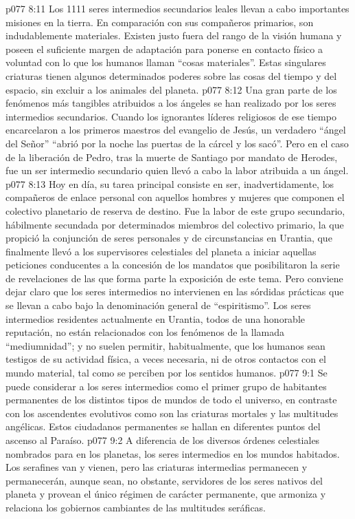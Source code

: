 \vs p077 8:11 Los 1111 seres intermedios secundarios leales llevan a cabo importantes misiones en la tierra. En comparación con sus compañeros primarios, son indudablemente materiales. Existen justo fuera del rango de la visión humana y poseen el suficiente margen de adaptación para ponerse en contacto físico a voluntad con lo que los humanos llaman “cosas materiales”. Estas singulares criaturas tienen algunos determinados poderes sobre las cosas del tiempo y del espacio, sin excluir a los animales del planeta.
\vs p077 8:12 Una gran parte de los fenómenos más tangibles atribuidos a los ángeles se han realizado por los seres intermedios secundarios. Cuando los ignorantes líderes religiosos de ese tiempo encarcelaron a los primeros maestros del evangelio de Jesús, un verdadero “ángel del Señor” “abrió por la noche las puertas de la cárcel y los sacó”. Pero en el caso de la liberación de Pedro, tras la muerte de Santiago por mandato de Herodes, fue un ser intermedio secundario quien llevó a cabo la labor atribuida a un ángel.
\vs p077 8:13 Hoy en día, su tarea principal consiste en ser, inadvertidamente, los compañeros de enlace personal con aquellos hombres y mujeres que componen el colectivo planetario de reserva de destino. Fue la labor de este grupo secundario, hábilmente secundada por determinados miembros del colectivo primario, la que propició la conjunción de seres personales y de circunstancias en Urantia, que finalmente llevó a los supervisores celestiales del planeta a iniciar aquellas peticiones conducentes a la concesión de los mandatos que posibilitaron la serie de revelaciones de las que forma parte la exposición de este tema. Pero conviene dejar claro que los seres intermedios no intervienen en las sórdidas prácticas que se llevan a cabo bajo la denominación general de “espiritismo”. Los seres intermedios residentes actualmente en Urantia, todos de una honorable reputación, no están relacionados con los fenómenos de la llamada “mediumnidad”; y no suelen permitir, habitualmente, que los humanos sean testigos de su actividad física, a veces necesaria, ni de otros contactos con el mundo material, tal como se perciben por los sentidos humanos.
\vs p077 9:1 Se puede considerar a los seres intermedios como el primer grupo de habitantes permanentes de los distintos tipos de mundos de todo el universo, en contraste con los ascendentes evolutivos como son las criaturas mortales y las multitudes angélicas. Estos ciudadanos permanentes se hallan en diferentes puntos del ascenso al Paraíso.
\vs p077 9:2 A diferencia de los diversos órdenes celestiales nombrados para  en los planetas, los seres intermedios  en los mundos habitados. Los serafines van y vienen, pero las criaturas intermedias permanecen y permanecerán, aunque sean, no obstante, servidores de los seres nativos del planeta y provean el único régimen de carácter permanente, que armoniza y relaciona los gobiernos cambiantes de las multitudes seráficas.
